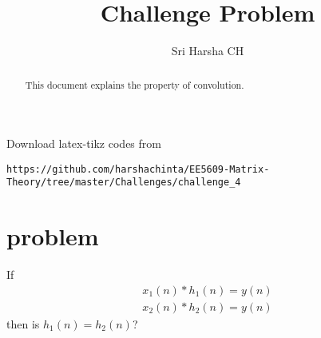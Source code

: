 \documentclass[journal,12pt,twocolumn]{IEEEtran}
\begin{document}
\renewcommand{\thefigure}{\theproblem}

\def\putbox#1#2#3{\makebox[0in][l]{\makebox[#1][l]{}\raisebox{\baselineskip}[0in][0in]{\raisebox{#2}[0in][0in]{#3}}}}
     \def\rightbox#1{\makebox[0in][r]{#1}}
     \def\centbox#1{\makebox[0in]{#1}}
     \def\topbox#1{\raisebox{-\baselineskip}[0in][0in]{#1}}
     \def\midbox#1{\raisebox{-0.5\baselineskip}[0in][0in]{#1}}
\vspace{3cm}
\title{Challenge Problem}
\author{Sri Harsha CH}

\maketitle
\newpage

\bigskip
\renewcommand{\thefigure}{\theenumi}
\renewcommand{\thetable}{\theenumi}

\begin{abstract}
This document explains the property of convolution.
\end{abstract}

Download latex-tikz codes from 
%
\begin{lstlisting}
https://github.com/harshachinta/EE5609-Matrix-Theory/tree/master/Challenges/challenge_4
\end{lstlisting}
%
\section{problem}
If 
\begin{align*}
    x_1(n) \ast h_1(n) = y(n)\\
    x_2(n) \ast h_2(n) = y(n)
\end{align*}
then is $h_1(n)=h_2(n)$?\\
\end{document}
